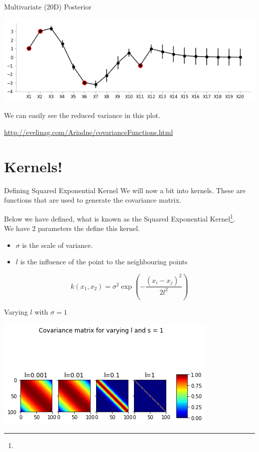\documentclass{beamer}
\begin{document}
\begin{frame}{Multivariate (20D) Posterior}
	\begin{center}
		\includegraphics[width=\linewidth, height=\textheight -120pt ,keepaspectratio]{gp/20dcov} \\
	\end{center}
	We can easily see the reduced variance in this plot.
\end{frame}

\urldef\urlsek\url{http://evelinag.com/Ariadne/covarianceFunctions.html}
\section{Kernels!}
\begin{frame}{Defining Squared Exponential Kernel}
	We will now a bit into kernels. These are functions that are used to generate the covariance matrix.
	
	Below we have defined, what is known as the Squared Exponential Kernel\footnote{\urlsek}. \\
	
	We have 2 parameters the define this kernel.
	\begin{itemize}
		\item $\sigma$ is the scale of variance.
		\item $l$ is the influence of the point to the neighbouring points
	\end{itemize}

	$$
	k(x_1, x_2) = \sigma^2 \exp\left(-\frac{(x_i - x_j)^2}{2l^2}\right)
	$$
\end{frame}

\begin{frame}{Varying $l$ with $\sigma = 1$}
	\begin{center}
		\includegraphics[width=\linewidth, height=\textheight -120pt ,keepaspectratio]{gp/vary_l}
	\end{center}
	
\end{frame}
\end{document}
